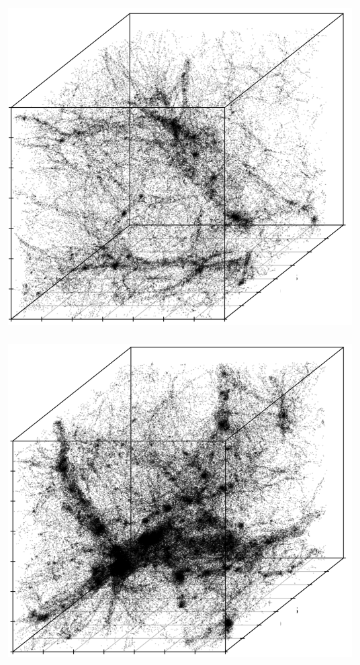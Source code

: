 \documentclass[12pt]{article}
\begin{document}
\begin{figure}[htp!]
  \centering
  \begin{subfigure}{0.25\textwidth}
    \centering
        \caption{}
  \includegraphics[width=\linewidth]{triplesplitA.pdf}
    \label{fig:cubeDiagsA}
  \end{subfigure}
    \begin{subfigure}{0.25\textwidth}
    \centering
        \caption{}
  \includegraphics[width=\linewidth]{triplesplitB.pdf}

\end{subfigure}
\end{figure}
\end{document}
